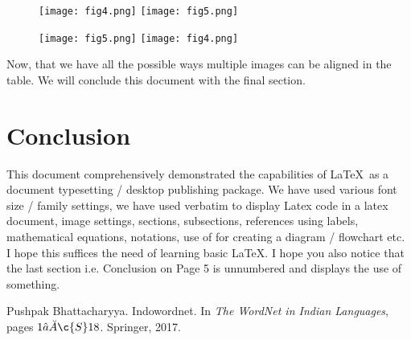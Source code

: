 \documentclass[15pt,a4paper]{article}
\begin{document}
\vspace{10mm}
\begin{figure}[htb]
    \texttt{[image: fig4.png]}%
    \hspace*{\fill}%
    \texttt{[image: fig5.png]}

    \texttt{[image: fig5.png]}%
    \hspace*{\fill}%
    \texttt{[image: fig4.png]}
\end{figure}

Now, that we have all the possible ways multiple images can be aligned in
the table. We will conclude this document with the final section.

\newpage

\section*{Conclusion}
This document comprehensively demonstrated the capabilities of \LaTeX \ as a
document typesetting / desktop publishing package. We have used various
font size / family settings, we have used verbatim to display Latex code
in a latex document, image settings, sections, subsections, references using
labels, mathematical equations, notations, use of  for creating
a diagram / flowchart etc.  I hope this suffices the need of learning basic \LaTeX. I hope you also notice that the last section i.e. Conclusion on Page
5 is unnumbered and displays the use of something.


\begin{thebibliography}{9}
Pushpak Bhattacharyya. Indowordnet. In 
\textit{The WordNet in Indian Languages}, 
pages $1\hat{a}\Breve{A}{{\c{S}}}18$.  Springer, 2017.
\end{thebibliography}
\end{document}
